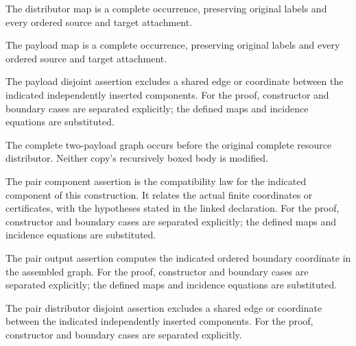 The distributor map is a complete occurrence, preserving original labels and every ordered source and target attachment.
\par{}

The payload map is a complete occurrence, preserving original labels and every ordered source and target attachment.
\par{}

The payload disjoint assertion excludes a shared edge or coordinate between the indicated independently inserted components.
For the proof, constructor and boundary cases are separated explicitly; the defined maps and incidence equations are substituted.
\par{}

The complete two-payload graph occurs before the original complete resource distributor. Neither copy's recursively boxed body is modified.
\par{}

The pair component assertion is the compatibility law for the indicated component of this construction. It relates the actual finite coordinates or certificates, with the hypotheses stated in the linked declaration.
For the proof, constructor and boundary cases are separated explicitly; the defined maps and incidence equations are substituted.
\par{}

The pair output assertion computes the indicated ordered boundary coordinate in the assembled graph.
For the proof, constructor and boundary cases are separated explicitly; the defined maps and incidence equations are substituted.
\par{}

The pair distributor disjoint assertion excludes a shared edge or coordinate between the indicated independently inserted components.
For the proof, constructor and boundary cases are separated explicitly.
\par{}

